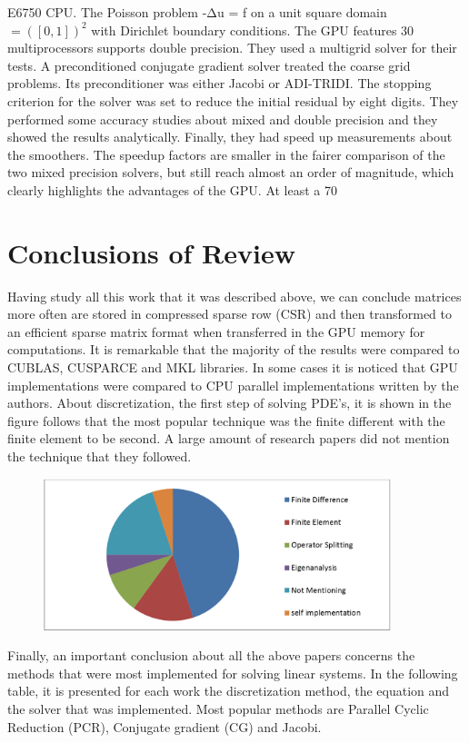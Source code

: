 E6750 CPU. The Poisson problem -Δu = f on a unit square domain  $= ([0,1])^2$ with Dirichlet boundary conditions. The GPU features 30 multiprocessors supports double precision. They used a multigrid solver for their tests. A preconditioned conjugate gradient solver treated the coarse grid problems. Its preconditioner was either Jacobi or ADI-TRIDI. The stopping criterion for the solver was set to reduce the initial residual by eight digits. They performed some accuracy studies about mixed and double precision and they showed the results analytically. Finally, they had speed up measurements about the smoothers. The speedup factors are smaller in the fairer comparison of the two mixed precision solvers, but still reach almost an order of magnitude, which clearly highlights the advantages of the GPU. At least a 70%




\section{Conclusions of Review}

Having study all this work that it was described above, we can conclude matrices more often are stored in compressed sparse row (CSR) and then transformed to an efficient sparse matrix format when transferred in the GPU memory for computations.
It is remarkable that the majority of the results were compared to CUBLAS, CUSPARCE and MKL libraries. In some cases it is noticed that GPU implementations were compared to CPU parallel implementations written by the authors.
About discretization, the first step of solving PDE’s, it is shown in the figure follows that the most popular technique was the finite different with the finite element to be second. A large amount of research papers did not mention the technique that they followed.

 \begin{figure}[H]
    \centering
        \includegraphics[totalheight=0.4\textheight,width=0.9\textwidth]{review_conclusion.png}
    \caption{}
    \label{fig:warp_scheduler}
\end{figure}

Finally, an important conclusion about all the above papers concerns the methods that were most implemented for solving linear systems. In the following table, it is presented for each work the discretization method, the equation and the solver that was implemented. Most popular methods are Parallel Cyclic Reduction (PCR), Conjugate gradient (CG) and Jacobi. 

